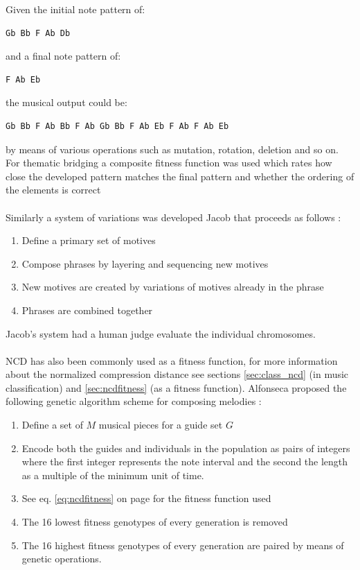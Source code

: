Given the initial note pattern of:
 \begin{verbatim}Gb Bb F Ab Db \end{verbatim}
and a final note pattern of:
\begin{verbatim}F Ab Eb \end{verbatim}
the musical output could be:
\begin{verbatim}Gb Bb F Ab Bb F Ab Gb Bb F Ab Eb F Ab F Ab Eb \end{verbatim} by means of various operations such as mutation, rotation, deletion and so on.
For thematic bridging a composite fitness function was used which rates how close the developed pattern matches the final pattern and whether the ordering of the elements is correct 
\\
\\
Similarly a system of variations was developed Jacob that proceeds as follows \cite{Jacob1995}:
\begin{enumerate}
\item Define a primary set of motives
\item Compose phrases by layering and sequencing new motives
\item New motives are created by variations of motives already in the phrase
\item Phrases are combined together
\end{enumerate}
Jacob's system had a human judge evaluate the individual chromosomes. 
\\
\\
\ac{NCD} has also been commonly used as a fitness function, for more information about the normalized compression distance see sections \ref{sec:class_ncd} (in music classification) and \ref{sec:ncdfitness} (as a fitness function).
Alfonseca proposed the following genetic algorithm scheme for composing melodies \cite{Alfonseca2007}:
\begin{enumerate}
\item Define a set of $M$ musical pieces for a guide set $G$
\item Encode both the guides and individuals in the population as pairs of integers where the first integer represents the note interval and the second the length as a multiple of the minimum unit of time.
\item See eq. \ref{eq:ncdfitness} on page \pageref{eq:ncdfitness} for the fitness function used
\item The 16 lowest fitness genotypes of every generation is removed
\item The 16 highest fitness genotypes of every generation are paired by means of genetic operations.
\end{enumerate}



